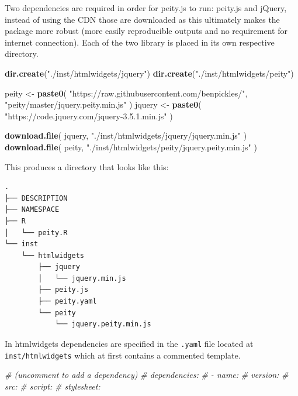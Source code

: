 \documentclass[10pt,]{krantz}
\makeatletter
\newenvironment{Shaded}{\begin{snugshade}}{\end{snugshade}}
\newcommand{\CommentTok}[1]{\textcolor[rgb]{0.37,0.37,0.37}{\textit{#1}}}
\newcommand{\KeywordTok}[1]{\textcolor[rgb]{0.27,0.27,0.27}{\textbf{#1}}}
\newcommand{\NormalTok}[1]{#1}
\newcommand{\StringTok}[1]{\textcolor[rgb]{0.5,0.5,0.5}{#1}}
\newenvironment{kframe}{%
\medskip{}
\setlength{\fboxsep}{.8em}
 \def\at@end@of@kframe{}%
 \ifinner\ifhmode%
  \def\at@end@of@kframe{\end{minipage}}%
  \begin{minipage}{\columnwidth}%
 \fi\fi%
 \def\FrameCommand##1{\hskip\@totalleftmargin \hskip-\fboxsep
 \colorbox{shadecolor}{##1}\hskip-\fboxsep
     \hskip-\linewidth \hskip-\@totalleftmargin \hskip\columnwidth}%
 \MakeFramed {\advance\hsize-\width
   \@totalleftmargin\z@ \linewidth\hsize
   \@setminipage}}%
 {\par\unskip\endMakeFramed%
 \at@end@of@kframe}
\renewenvironment{Shaded}{\begin{kframe}}{\end{kframe}}
\makeatother
\begin{document}
Two dependencies are required in order for peity.js to run: peity.js and jQuery, instead of using the CDN those are downloaded as this ultimately makes the package more robust (more easily reproducible outputs and no requirement for internet connection). Each of the two library is placed in its own respective directory.

\begin{Shaded}
\begin{Highlighting}[]
\KeywordTok{dir.create}\NormalTok{(}\StringTok{"./inst/htmlwidgets/jquery"}\NormalTok{)}
\KeywordTok{dir.create}\NormalTok{(}\StringTok{"./inst/htmlwidgets/peity"}\NormalTok{)}

\NormalTok{peity <-}\StringTok{ }\KeywordTok{paste0}\NormalTok{(}
  \StringTok{"https://raw.githubusercontent.com/benpickles/"}\NormalTok{,}
  \StringTok{"peity/master/jquery.peity.min.js"}
\NormalTok{)}
\NormalTok{jquery <-}\StringTok{ }\KeywordTok{paste0}\NormalTok{(}
  \StringTok{"https://code.jquery.com/jquery-3.5.1.min.js"}
\NormalTok{)}

\KeywordTok{download.file}\NormalTok{(}
\NormalTok{  jquery, }\StringTok{"./inst/htmlwidgets/jquery/jquery.min.js"}
\NormalTok{)}
\KeywordTok{download.file}\NormalTok{(}
\NormalTok{  peity, }\StringTok{"./inst/htmlwidgets/peity/jquery.peity.min.js"}
\NormalTok{)}
\end{Highlighting}
\end{Shaded}

This produces a directory that looks like this:

\begin{verbatim}
.
├── DESCRIPTION
├── NAMESPACE
├── R
│   └── peity.R
└── inst
    └── htmlwidgets
        ├── jquery
        │   └── jquery.min.js
        ├── peity.js
        ├── peity.yaml
        └── peity
            └── jquery.peity.min.js
\end{verbatim}

In htmlwidgets dependencies are specified in the \texttt{.yaml} file located at \texttt{inst/htmlwidgets} which at first contains a commented template.

\begin{Shaded}
\begin{Highlighting}[]
\CommentTok{# (uncomment to add a dependency)}
\CommentTok{# dependencies:}
\CommentTok{#  - name:}
\CommentTok{#    version:}
\CommentTok{#    src:}
\CommentTok{#    script:}
\CommentTok{#    stylesheet:}
\end{Highlighting}
\end{Shaded}
\end{document}
